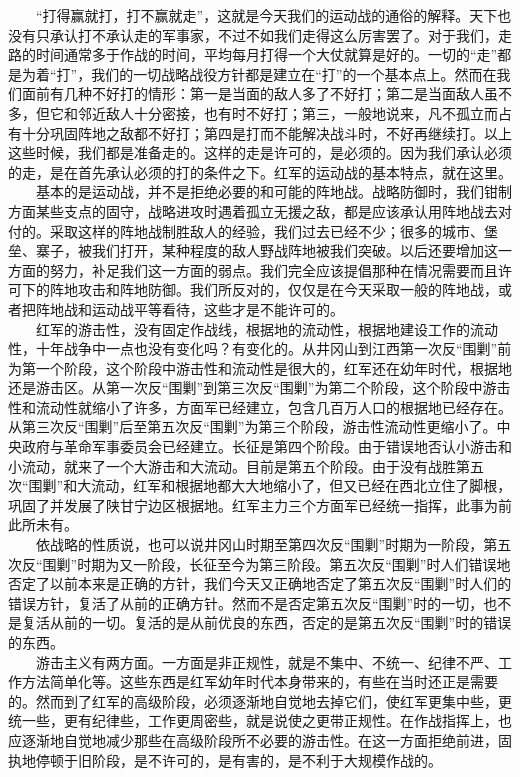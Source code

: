 \documentclass[cn,11pt,chinese]{elegantbook}
\begin{document}
　　“打得赢就打，打不赢就走”，这就是今天我们的运动战的通俗的解释。天下也没有只承认打不承认走的军事家，不过不如我们走得这么厉害罢了。对于我们，走路的时间通常多于作战的时间，平均每月打得一个大仗就算是好的。一切的“走”都是为着“打”，我们的一切战略战役方针都是建立在“打”的一个基本点上。然而在我们面前有几种不好打的情形：第一是当面的敌人多了不好打；第二是当面敌人虽不多，但它和邻近敌人十分密接，也有时不好打；第三，一般地说来，凡不孤立而占有十分巩固阵地之敌都不好打；第四是打而不能解决战斗时，不好再继续打。以上这些时候，我们都是准备走的。这样的走是许可的，是必须的。因为我们承认必须的走，是在首先承认必须的打的条件之下。红军的运动战的基本特点，就在这里。\\
　　基本的是运动战，并不是拒绝必要的和可能的阵地战。战略防御时，我们钳制方面某些支点的固守，战略进攻时遇着孤立无援之敌，都是应该承认用阵地战去对付的。采取这样的阵地战制胜敌人的经验，我们过去已经不少；很多的城市、堡垒、寨子，被我们打开，某种程度的敌人野战阵地被我们突破。以后还要增加这一方面的努力，补足我们这一方面的弱点。我们完全应该提倡那种在情况需要而且许可下的阵地攻击和阵地防御。我们所反对的，仅仅是在今天采取一般的阵地战，或者把阵地战和运动战平等看待，这些才是不能许可的。\\
　　红军的游击性，没有固定作战线，根据地的流动性，根据地建设工作的流动性，十年战争中一点也没有变化吗？有变化的。从井冈山到江西第一次反“围剿”前为第一个阶段，这个阶段中游击性和流动性是很大的，红军还在幼年时代，根据地还是游击区。从第一次反“围剿”到第三次反“围剿”为第二个阶段，这个阶段中游击性和流动性就缩小了许多，方面军已经建立，包含几百万人口的根据地已经存在。从第三次反“围剿”后至第五次反“围剿”为第三个阶段，游击性流动性更缩小了。中央政府与革命军事委员会已经建立。长征是第四个阶段。由于错误地否认小游击和小流动，就来了一个大游击和大流动。目前是第五个阶段。由于没有战胜第五次“围剿”和大流动，红军和根据地都大大地缩小了，但又已经在西北立住了脚根，巩固了并发展了陕甘宁边区根据地。红军主力三个方面军已经统一指挥，此事为前此所未有。\\
　　依战略的性质说，也可以说井冈山时期至第四次反“围剿”时期为一阶段，第五次反“围剿”时期为又一阶段，长征至今为第三阶段。第五次反“围剿”时人们错误地否定了以前本来是正确的方针，我们今天又正确地否定了第五次反“围剿”时人们的错误方针，复活了从前的正确方针。然而不是否定第五次反“围剿”时的一切，也不是复活从前的一切。复活的是从前优良的东西，否定的是第五次反“围剿”时的错误的东西。\\
　　游击主义有两方面。一方面是非正规性，就是不集中、不统一、纪律不严、工作方法简单化等。这些东西是红军幼年时代本身带来的，有些在当时还正是需要的。然而到了红军的高级阶段，必须逐渐地自觉地去掉它们，使红军更集中些，更统一些，更有纪律些，工作更周密些，就是说使之更带正规性。在作战指挥上，也应逐渐地自觉地减少那些在高级阶段所不必要的游击性。在这一方面拒绝前进，固执地停顿于旧阶段，是不许可的，是有害的，是不利于大规模作战的。\\
\end{document}
